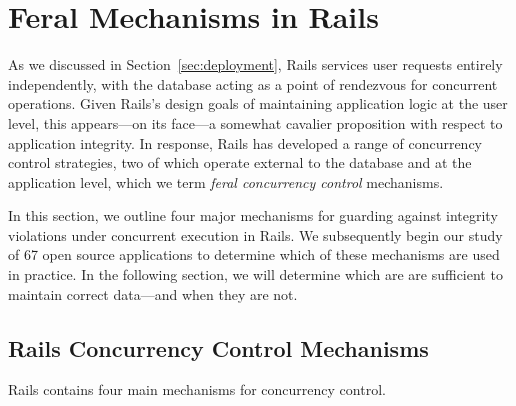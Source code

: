 
\section{Feral Mechanisms in Rails}
\label{sec:rails-cc}

As we discussed in Section~\ref{sec:deployment}, Rails services user
requests entirely independently, with the database acting as a point
of rendezvous for concurrent operations. Given Rails's design goals of
maintaining application logic at the user level, this appears---on its
face---a somewhat cavalier proposition with respect to application
integrity. In response, Rails has developed a range of concurrency
control strategies, two of which operate external to the database and
at the application level, which we term \textit{feral concurrency
  control} mechanisms.

In this section, we outline four major mechanisms for guarding against
integrity violations under concurrent execution in Rails. We
subsequently begin our study of 67 open source applications to
determine which of these mechanisms are used in practice. In the following
section, we will determine which are are sufficient to maintain
correct data---and when they are not.

\subsection{Rails Concurrency Control Mechanisms}

Rails contains four main mechanisms for concurrency control.

